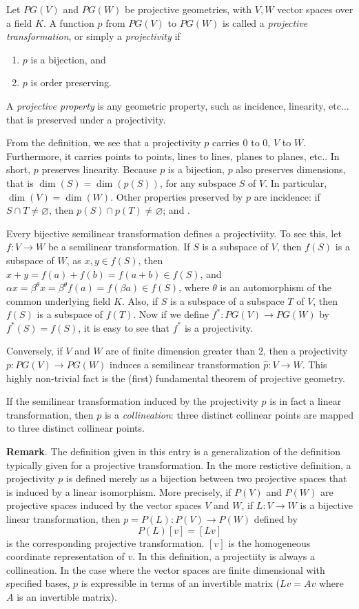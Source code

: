 \documentclass[12pt]{article}
\begin{document}
Let $PG(V)$ and $PG(W)$ be projective geometries, with $V,W$ vector spaces over a field $K$.  A function $p$ from $PG(V)$ to $PG(W)$ is called a \emph{projective transformation}, or simply a \emph{projectivity} if
\begin{enumerate}
\item $p$ is a bijection, and
\item $p$ is order preserving.
\end{enumerate}

A \emph{projective property} is any geometric property, such as incidence, linearity, etc... that is preserved under a projectivity.

From the definition, we see that a projectivity $p$ carries 0 to 0, $V$ to $W$.  Furthermore, it carries points to points, lines to lines, planes to planes, etc.. In short, $p$ preserves linearity.  Because $p$ is a bijection, $p$ also preserves dimensions, that is $\dim(S)=\dim(p(S))$, for any subspace $S$ of $V$.  In particular, $\dim(V)=\dim(W)$.  Other properties preserved by $p$ are incidence: if $S\cap T\ne\varnothing$, then $p(S)\cap p(T)\neq \varnothing$; and .

Every bijective semilinear transformation defines a projectiviity.  To see this, let $f:V\to W$ be a semilinear transformation.  If $S$ is a subspace of $V$, then $f(S)$ is a subspace of $W$, as $x,y\in f(S)$, then $x+y=f(a)+f(b)=f(a+b)\in f(S)$, and $\alpha x={\beta}^{\theta}x={\beta}^{\theta}f(a)=f(\beta a)\in f(S)$, where $\theta$ is an automorphism of the common underlying field $K$.  Also, if $S$ is a subspace of a subspace $T$ of $V$, then $f(S)$ is a subspace of $f(T)$.  Now if we define $f^*:PG(V)\to PG(W)$ by $f^*(S)=f(S)$, it is easy to see that $f^*$ is a projectivity.

Conversely, if $V$ and $W$ are of finite dimension greater than $2$, then a projectivity $p:PG(V)\to PG(W)$ induces a semilinear transformation $\hat{p}:V\to W$.  This highly non-trivial fact is the (first) fundamental theorem of projective geometry.

If the semilinear transformation induced by the projectivity $p$ is in fact a linear transformation, then $p$ is a {\it collineation}: three distinct collinear points are mapped to three distinct collinear points.

\textbf{Remark}.  The definition given in this entry is a generalization of the definition typically given for a projective transformation.  In the more restictive definition, a projectivity $p$ is defined merely as a bijection between two projective spaces that is induced by a linear isomorphism.  More precisely, if $P(V)$ and $P(W)$ are projective spaces induced by the vector spaces $V$ and $W$, if $L:V\to W$ is a bijective linear transformation, then $p=P(L):P(V)\to P(W)$ defined by $$P(L)[v]=[Lv]$$ is the corresponding projective transformation.  $[v]$ is the homogeneous coordinate representation of $v$.  In this definition, a projectiity is always a collineation.  In the case where the vector spaces are finite dimensional with specified bases, $p$ is expressible in terms of an invertible matrix ($Lv=Av$ where $A$ is an invertible matrix).
\end{document}
